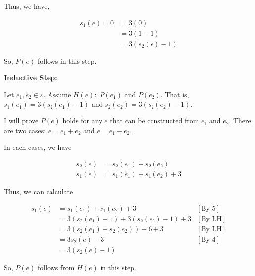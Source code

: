 \documentclass[12pt]{article}
\begin{document}
\begin{itemize}
\begin{mdframed}
        Thus, \color{red}we have,\color{black}

        \begin{align}
            s_1(e) = 0 &= 3(0)\\
            &= 3(1-1)\\
            &= 3(s_2(e) - 1)
        \end{align}

        \bigskip

        So, $P(e)$ \color{red}follows in this step\color{black}.

        \bigskip

        \underline{\textbf{Inductive Step:}}

        \bigskip

        Let $e_1, e_2 \in \varepsilon$. Assume $H(e):$ $P(e_1)$ and $P(e_2)$.
        That is, $s_1(e_1) = 3(s_2(e_1) - 1)$ and $s_2(e_2) = 3(s_2(e_2) - 1)$.
        \bigskip

        \color{red}I will prove $P(e)$ holds for any $e$ that can be constructed
        from $e_1$ and $e_2$. There are two cases:  $e = e_1 + e_2$ and $e = e_1 - e_2$.

        \bigskip

        In each cases, we have\color{black}

        \bigskip

        \begin{align}
            s_2(e) &= s_2(e_1) + s_2(e_2)\\
            s_1(e) &= s_1(e_1) + s_1(e_2) + 3
        \end{align}

        \bigskip

        Thus, we can calculate

        \begin{align}
            s_1(e) &= s_1(e_1) + s_1(e_2) + 3 & [\text{By 5}]\\
            &= 3(s_2(e_1) - 1) + 3(s_2(e_2) - 1) + 3 & [\text{By I.H}]\\
            &= 3(s_2(e_1) + s_2(e_2)) - 6 + 3 & [\text{By I.H}]\\
            &= 3s_2(e) - 3 & [\text{By 4}]\\
            &= 3(s_2(e) - 1)
        \end{align}

        \bigskip

        \color{red}So, $P(e)$ follows from $H(e)$ in this step.\color{black}
    \end{mdframed}


\end{itemize}
\end{document}
